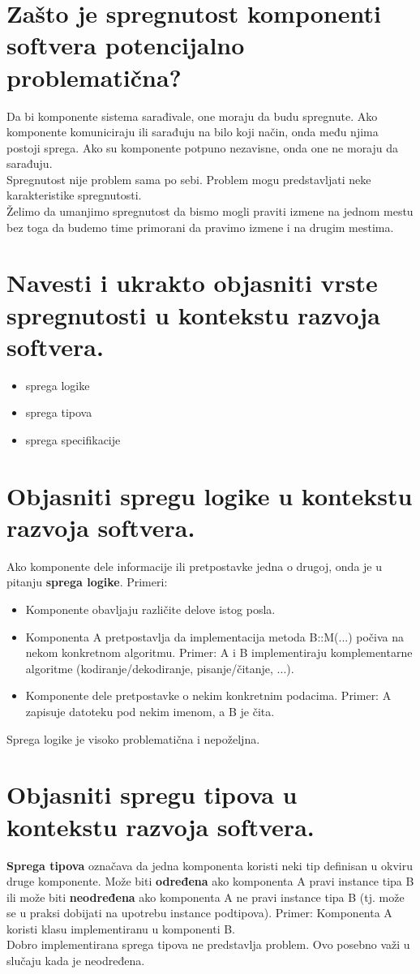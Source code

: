 \documentclass[a4paper]{article}
\begin{document}
\section{Zašto je spregnutost komponenti softvera potencijalno problematična?}
  Da bi komponente sistema sarađivale, one moraju da budu spregnute. Ako komponente 
  komuniciraju ili sarađuju na bilo koji način, onda među njima postoji sprega. Ako
  su komponente potpuno nezavisne, onda one ne moraju da sarađuju. \\
  \indent Spregnutost nije problem sama po sebi. Problem mogu predstavljati neke karakteristike
  spregnutosti. \\
  \indent Želimo da umanjimo spregnutost da bismo mogli praviti izmene na jednom mestu bez toga
  da budemo time primorani da pravimo izmene i na drugim mestima. 

\section{Navesti i ukrakto objasniti vrste spregnutosti u kontekstu razvoja softvera.}
  \begin{itemize}
    \item sprega logike
    \item sprega tipova
    \item sprega specifikacije
  \end{itemize}

\section{Objasniti spregu logike u kontekstu razvoja softvera.}
  Ako komponente dele informacije ili pretpostavke jedna o drugoj, onda je u pitanju
  \textbf{sprega logike}. Primeri:
  \begin{itemize}
    \item Komponente obavljaju različite delove istog posla.
    \item Komponenta A pretpostavlja da implementacija metoda B::M(...) počiva na nekom
          konkretnom algoritmu. Primer: A i B implementiraju komplementarne algoritme
          (kodiranje/dekodiranje, pisanje/čitanje, ...).
    \item Komponente dele pretpostavke o nekim konkretnim podacima. Primer: 
          A zapisuje datoteku pod nekim imenom, a B je čita.
  \end{itemize}
  Sprega logike je visoko problematična i nepoželjna.

\section{Objasniti spregu tipova u kontekstu razvoja softvera.}
  \textbf{Sprega tipova} označava da jedna komponenta koristi neki tip definisan u okviru druge
  komponente. Može biti \textbf{određena} ako komponenta A pravi instance tipa B ili
  može biti \textbf{neodređena} ako komponenta A ne pravi instance tipa B (tj. može se u praksi
  dobijati na upotrebu instance podtipova). Primer: Komponenta A koristi klasu implementiranu
  u komponenti B. \\
  \indent Dobro implementirana sprega tipova ne predstavlja problem. Ovo posebno važi u slučaju
  kada je neodređena.
\end{document}
